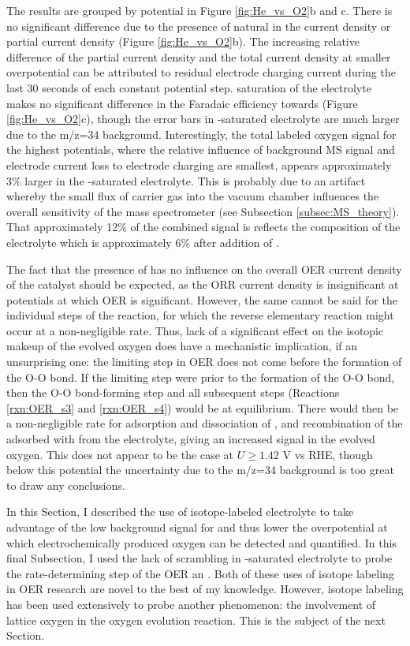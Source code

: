 The results are grouped by potential in Figure \ref{fig:He_vs_O2}b and c. There is no significant difference due to the presence of natural  in the current density or  partial current density (Figure \ref{fig:He_vs_O2}b). The increasing relative difference of the  partial current density and the total current density at smaller overpotential can be attributed to residual electrode charging current during the last 30 seconds of each constant potential step.  saturation of the electrolyte makes no significant difference in the Faradaic efficiency towards  (Figure \ref{fig:He_vs_O2}c), though the error bars in -saturated electrolyte are much larger due to the m/z=34 background. Interestingly, the total labeled oxygen signal for the highest potentials, where the relative influence of background MS signal and electrode current loss to electrode charging are smallest, appears approximately 3\% larger in the -saturated electrolyte. This is probably due to an artifact whereby the small flux of  carrier gas into the vacuum chamber influences the overall sensitivity of the mass spectrometer (see Subsection \ref{subsec:MS_theory}). That approximately 12\% of the combined  signal is  reflects the composition of the electrolyte which is approximately 6\%  after addition of .

The fact that the presence of  has no influence on the overall OER current density of the catalyst should be expected, as the ORR current density is insignificant at potentials at which OER is significant. However, the same cannot be said for the individual steps of the reaction, for which the reverse elementary reaction might occur at a non-negligible rate. Thus, lack of a significant effect on the isotopic makeup of the evolved oxygen does have a mechanistic implication, if an unsurprising one: the limiting step in OER does not come before the formation of the O-O bond. If the limiting step were prior to the formation of the O-O bond, then the O-O bond-forming step and all subsequent steps (Reactions \ref{rxn:OER_s3} and \ref{rxn:OER_s4}) would be at equilibrium. There would then be a non-negligible rate for adsorption and dissociation of , and recombination of the adsorbed  with  from the electrolyte, giving an increased  signal in the evolved oxygen. This does not appear to be the case at $U\ge1.42$ V vs RHE, though below this potential the uncertainty due to the m/z=34 background is too great to draw any conclusions. 

In this Section, I described the use of isotope-labeled electrolyte to take advantage of the low background signal for  and thus lower the overpotential at which electrochemically produced oxygen can be detected and quantified. In this final Subsection, I used the lack of scrambling in -saturated  electrolyte to probe the rate-determining step of the OER an . Both of these uses of isotope labeling in OER research are novel to the best of my knowledge. However, isotope labeling has been used extensively to probe another phenomenon: the involvement of lattice oxygen in the oxygen evolution reaction. This is the subject of the next Section.